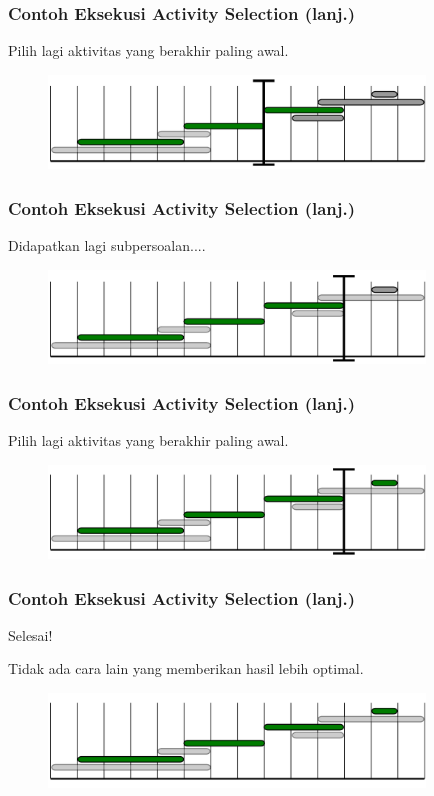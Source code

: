 \begin{frame}
  \frametitle{Contoh Eksekusi Activity Selection (lanj.)}
  Pilih lagi aktivitas yang berakhir paling awal.
  \begin{figure}
    \includegraphics[width=10cm]{asset/activity-selection-algo-6.pdf}
  \end{figure}
\end{frame}

\begin{frame}
  \frametitle{Contoh Eksekusi Activity Selection (lanj.)}
  Didapatkan lagi subpersoalan....
  \begin{figure}
    \includegraphics[width=10cm]{asset/activity-selection-algo-7.pdf}
  \end{figure}
\end{frame}

\begin{frame}
  \frametitle{Contoh Eksekusi Activity Selection (lanj.)}
  Pilih lagi aktivitas yang berakhir paling awal.
  \begin{figure}
    \includegraphics[width=10cm]{asset/activity-selection-algo-8.pdf}
  \end{figure}
\end{frame}

\begin{frame}
  \frametitle{Contoh Eksekusi Activity Selection (lanj.)}
  Selesai!

  Tidak ada cara lain yang memberikan hasil lebih optimal.
  \begin{figure}
    \includegraphics[width=10cm]{asset/activity-selection-algo-9.pdf}
  \end{figure}
\end{frame}


